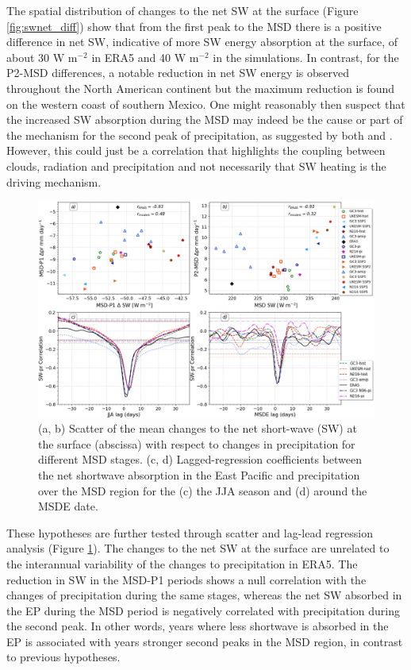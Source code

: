 The spatial distribution of changes to the net SW at the surface (Figure \ref{fig:swnet_diff}) show that from the first peak to the MSD there is a positive difference in net SW, indicative of more SW energy absorption at the surface, of about 30 W m$^{-2}$ in ERA5 and 40 W m$^{-2}$ in the simulations. In contrast, for the P2-MSD differences, a notable reduction in net SW energy is observed throughout the North American continent but the maximum reduction is found on the western coast of southern Mexico. One might reasonably then suspect that the increased SW absorption during the MSD may indeed be the cause or part of the mechanism for the second peak of precipitation, as suggested by both \cite{magana1999} and \cite{karnauskas2013}. However, this could just be a correlation that highlights the coupling between clouds, radiation and precipitation and not necessarily that SW heating is the driving mechanism.

\begin{figure}[t!]
\includegraphics[width=\linewidth]{figures/cloud_scatter_f.png}
\caption[Scatterplot and lagged-regression of surface short-wave]{(a, b) Scatter of the mean changes to the net short-wave (SW) at the surface (abscissa) with respect to changes in precipitation for different MSD stages. (c, d) Lagged-regression coefficients between the net shortwave absorption in the East Pacific and precipitation over the MSD region for the (c) the JJA season and (d) around the MSDE date.}
\label{fig:cloud_scatter}
\end{figure}

These hypotheses are further tested through scatter and lag-lead regression analysis (Figure \ref{fig:cloud_scatter}). The changes to the net SW at the surface are unrelated to the interannual variability of the changes to precipitation in ERA5. The reduction in SW in the MSD-P1 periods shows a null correlation with the changes of precipitation during the same stages, whereas the net SW absorbed in the EP during the MSD period is negatively correlated with precipitation during the second peak. In other words, years where less shortwave is absorbed in the EP is associated with years stronger second peaks in the MSD region, in contrast to previous hypotheses. 

